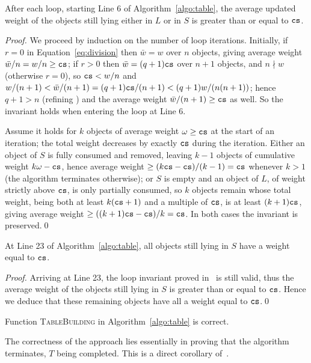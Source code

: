 \begin{lemma}
\label{lem:seq_increase}
    After each loop, starting Line 6 of Algorithm~\ref{algo:table}, the average updated weight of the objects still lying either in $L$
    or in $S$ is greater than or equal to $\texttt{cs}$.
\end{lemma}
\begin{proof}
    We proceed by induction on the number of loop iterations. Initially, if $r=0$ in
    Equation~\eqref{eq:division} then $\bar{w} = w$ over $n$ objects, giving average weight
    $\bar w/n = w/n \geq \texttt{cs}$; if $r>0$ then $\bar{w} = (q+1)\texttt{cs}$ over $n+1$ objects, and $n \nmid w$
    (otherwise $r=0$), so $\texttt{cs} < w/n$ and $w/(n+1) < \bar{w}/(n+1) = (q+1)\texttt{cs}/(n+1) < (q+1)w/(n(n+1))$;
    hence $q+1 > n$ (refining ) and the average weight $\bar{w}/(n+1) \geq \texttt{cs}$ as
    well. So the invariant holds when entering the loop at Line 6.

    Assume it holds for $k$ objects of average weight $\omega \geq \texttt{cs}$ at the start of an iteration; the
    total weight decreases by exactly $\texttt{cs}$ during the iteration. Either an object of $S$ is fully consumed
    and removed, leaving $k-1$ objects of cumulative weight $k\omega - \texttt{cs}$, hence average weight
    $\geq (k\texttt{cs}-\texttt{cs})/(k-1) = \texttt{cs}$ whenever $k>1$ (the algorithm terminates otherwise); or $S$ is empty and
    an object of $L$, of weight strictly above $\texttt{cs}$, is only partially consumed, so $k$ objects remain
    whose total weight, being both at least $k(\texttt{cs}+1)$ and a multiple of $\texttt{cs}$, is at least $(k+1)\texttt{cs}$,
    giving average weight $\geq ((k+1)\texttt{cs} - \texttt{cs})/k = \texttt{cs}$. In both cases the invariant is preserved.\qed
\end{proof}
\begin{lemma}
\label{lem:res_without aliases}
    At Line 23 of Algorithm~\ref{algo:table}, all objects still lying in $S$ have a weight equal to $\texttt{cs}$.
\end{lemma}
\begin{proof}
    Arriving at Line 23, the loop invariant proved in~ is still valid, thus the 
    average weight of the objects still lying in $S$ is greater than or equal to $\texttt{cs}$.
    Hence we deduce that these remaining objects have all a weight equal to $\texttt{cs}$.\qed
\end{proof}


\begin{theorem}
\label{theo:correctness}
    Function \textsc{TableBuilding} in Algorithm~\ref{algo:table} is correct.
\end{theorem}
The correctness of the approach lies essentially in proving that the algorithm terminates, $T$ being completed. This is a direct corollary of~.




